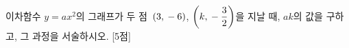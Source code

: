 이차함수 $y=ax^2$의 그래프가 두 점~$(3{,}\mkern3mu -6)$, $\left(k{,}\mkern3mu -\dfrac{3}{2}\right)$을 지날 때, $ak$의 값을 구하고, 그 과정을 서술하시오.  \mbox{[5점]}
